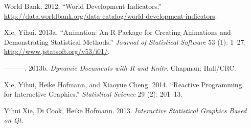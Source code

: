 \documentclass[12pt,]{isuthesis}
\begin{document}
\hypertarget{ref-WorldBank}{}
World Bank. 2012. ``World Development Indicators.''
\url{http://data.worldbank.org/data-catalog/world-development-indicators}.

\hypertarget{ref-animation}{}
Xie, Yihui. 2013a. ``Animation: An R Package for Creating Animations and
Demonstrating Statistical Methods.'' \emph{Journal of Statistical
Software} 53 (1): 1--27. \url{http://www.jstatsoft.org/v53/i01/}.

\hypertarget{ref-knitr}{}
---------. 2013b. \emph{Dynamic Documents with R and Knitr}. Chapman;
Hall/CRC.

\hypertarget{ref-Xie:2014co}{}
Xie, Yihui, Heike Hofmann, and Xiaoyue Cheng. 2014. ``Reactive
Programming for Interactive Graphics.'' \emph{Statistical Science} 29
(2): 201--13.

\hypertarget{ref-cranvas}{}
Yihui Xie, Di Cook, Heike Hofmann. 2013. \emph{Interactive Statistical
Graphics Based on Qt}.



\end{document}
